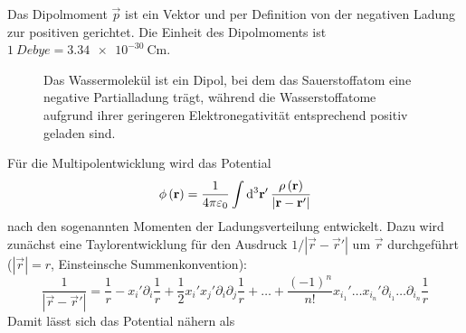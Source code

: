 Das Dipolmoment $\vec {p}$ ist ein Vektor und per Definition von der negativen Ladung zur positiven gerichtet. Die Einheit des Dipolmoments ist $\SI{1}{Debye}=\SI{3,34e-30}{\coulomb\m}$.



\begin{figure}[htb]
	\centering
	\tfigWatermolecule
	\caption{Das Wassermolekül ist ein Dipol, bei dem das Sauerstoffatom eine negative Partialladung trägt, während die Wasserstoffatome aufgrund ihrer geringeren Elektronegativität entsprechend positiv geladen sind. }
	\label{fig:water_molecule}
\end{figure}

Für die Multipolentwicklung wird das Potential
\begin{equation*}
	\phi \left(\vec {r}\right)=\frac{1}{4\pi \varepsilon _{0}}\int \diffa[3]{\vec{r}'}\frac{\rho \left(\vec {r}\right)}{\left| \vec {r}-\vec {r}'\right| }
\end{equation*}
nach den sogenannten Momenten der Ladungsverteilung entwickelt. Dazu wird zunächst eine Taylorentwicklung für den Ausdruck $1/\left| \vec {r}-\vec {r}'\right| $ um $\vec {r}$ durchgeführt ($\left| \vec {r}\right| =r$, Einsteinsche Summenkonvention):
\begin{equation*}
	\frac{1}{\left| \vec {r}-\vec {r}'\right| }=\frac{1}{r}-x_{i}'\partial _{i}\frac{1}{r}+\frac{1}{2}x_{i}'x_{j}'\partial _{i}\partial _{j}\frac{1}{r}+\ldots +\frac{\left(-1\right)^{n}}{n!}x_{i_{1}}'\ldots x_{i_{n}}'\partial _{{i_{1}}}\ldots \partial _{{i_{n}}}\frac{1}{r}
\end{equation*}
Damit lässt sich das Potential nähern als
